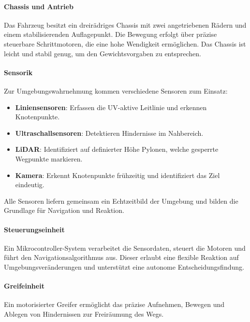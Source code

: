 \documentclass[main.tex]{subfiles} %
\begin{document}
\paragraph{Chassis und Antrieb}

Das Fahrzeug besitzt ein dreirädriges Chassis mit zwei angetriebenen Rädern und einem 
stabilisierenden Auflagepunkt. Die Bewegung erfolgt über präzise steuerbare Schrittmotoren, 
die eine hohe Wendigkeit ermöglichen. Das Chassis ist leicht und stabil genug, um den 
Gewichtsvorgaben zu entsprechen.

\paragraph{Sensorik}

Zur Umgebungswahrnehmung kommen verschiedene Sensoren zum Einsatz:

\begin{itemize}
  \item \textbf{Liniensensoren}: Erfassen die UV-aktive Leitlinie und erkennen Knotenpunkte.
  \item \textbf{Ultraschallsensoren}: Detektieren Hindernisse im Nahbereich.
  \item \textbf{LiDAR}: Identifiziert auf definierter Höhe Pylonen, welche gesperrte Wegpunkte markieren.
  \item \textbf{Kamera}: Erkennt Knotenpunkte frühzeitig und identifiziert das Ziel eindeutig.
\end{itemize}

Alle Sensoren liefern gemeinsam ein Echtzeitbild der Umgebung und bilden die Grundlage für Navigation und Reaktion.


\paragraph{Steuerungseinheit}

Ein Mikrocontroller-System verarbeitet die Sensordaten, steuert die Motoren und führt den 
Navigationsalgorithmus aus. Dieser erlaubt eine flexible Reaktion auf Umgebungsveränderungen 
und unterstützt eine autonome Entscheidungsfindung.

\paragraph{Greifeinheit}

Ein motorisierter Greifer ermöglicht das präzise Aufnehmen, Bewegen und Ablegen von Hindernissen 
zur Freiräumung des Wegs.
\end{document}
